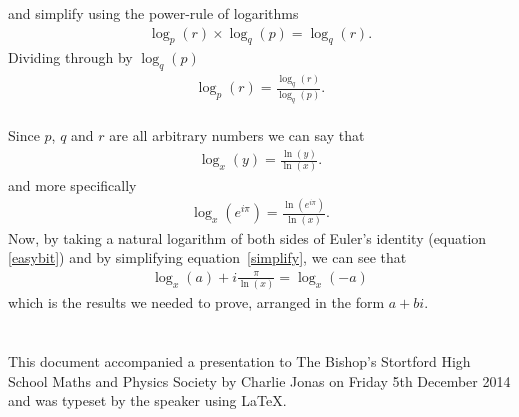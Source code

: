 \documentclass[12pt]{article}
\begin{document}
and simplify using the power-rule of logarithms
\begin{align}
\log_p (r) \times \log_q (p) = \log_q (r).
\end{align}
Dividing through by $ \log_q (p) $
\begin{align}
\log_p (r) = \frac{\log_q (r)}{\log_q (p)}.
\end{align}\\
Since $ p $, $ q $ and $ r $ are all arbitrary numbers we can say that
\begin{align}
\log_x (y) = \frac{\ln (y)}{\ln (x)}.
\end{align}
and more specifically
\begin{align}
\log_x (e^{i\pi}) = \frac{\ln (e^{i\pi})}{\ln (x)}.
\end{align}
Now, by taking a natural logarithm of both sides of Euler's identity (equation \eqref{easybit}) and by simplifying equation~\eqref{simplify}, we can see that
\begin{align}
\boxed{\log_x (a) + i\frac{\pi}{\ln (x)} = \log_x (-a)}
\end{align}
which is the results we needed to prove, arranged in the form $ a+bi $.
\\\\\\

\noindent
This document accompanied a presentation to The Bishop's Stortford High School Maths and Physics Society by Charlie Jonas on Friday 5th December 2014 and was typeset by the speaker using \LaTeX .
\end{document}
